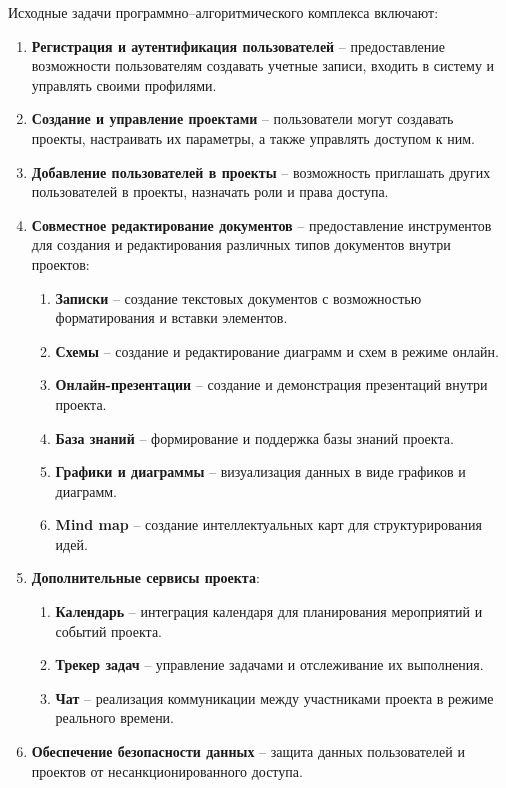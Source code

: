 Исходные задачи программно--алгоритмического комплекса включают:

\begin{enumerate}[wide=12.5mm, leftmargin=12.5mm]
    \item \textbf{Регистрация и аутентификация пользователей} -- предоставление возможности пользователям создавать учетные записи, входить в систему и управлять своими профилями.
    \item \textbf{Создание и управление проектами} -- пользователи могут создавать проекты, настраивать их параметры, а также управлять доступом к ним.
    \item \textbf{Добавление пользователей в проекты} -- возможность приглашать других пользователей в проекты, назначать роли и права доступа.
    \item \textbf{Совместное редактирование документов} -- предоставление инструментов для создания и редактирования различных типов документов внутри проектов:
    \begin{enumerate}
        \item \textbf{Записки} -- создание текстовых документов с возможностью форматирования и вставки элементов.
        \item \textbf{Схемы} -- создание и редактирование диаграмм и схем в режиме онлайн.
        \item \textbf{Онлайн-презентации} -- создание и демонстрация презентаций внутри проекта.
        \item \textbf{База знаний} -- формирование и поддержка базы знаний проекта.
        \item \textbf{Графики и диаграммы} -- визуализация данных в виде графиков и диаграмм.
        \item \textbf{Mind map} -- создание интеллектуальных карт для структурирования идей.
    \end{enumerate}
    \item \textbf{Дополнительные сервисы проекта}:
    \begin{enumerate}
        \item \textbf{Календарь} -- интеграция календаря для планирования мероприятий и событий проекта.
        \item \textbf{Трекер задач} -- управление задачами и отслеживание их выполнения.
        \item \textbf{Чат} -- реализация коммуникации между участниками проекта в режиме реального времени.
    \end{enumerate}
    \item \textbf{Обеспечение безопасности данных} -- защита данных пользователей и проектов от несанкционированного доступа.

\end{enumerate}
